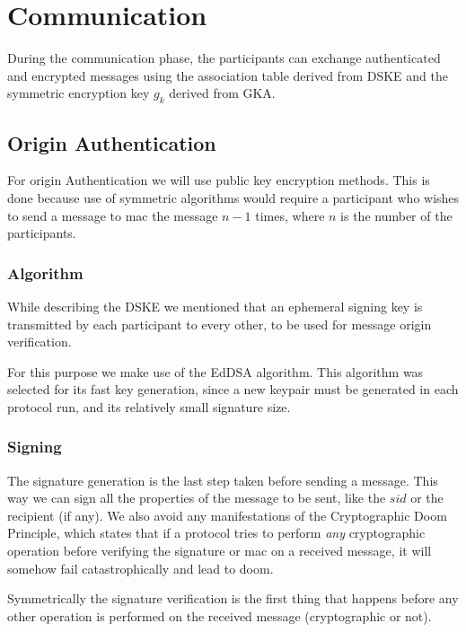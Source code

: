 \documentclass[12pt,titlepage,a4paper]{article}
\begin{document}
{\section{Communication}

During the communication phase, the participants can exchange authenticated
and encrypted messages using the association table derived from DSKE and the
symmetric encryption key $g_k$ derived from GKA.

\subsection{Origin Authentication}

For origin Authentication we will use public key encryption methods. This is
done because use of symmetric algorithms would require a participant who
wishes to send a message to mac the message $n-1$ times, where $n$ is the
number of the participants.

\subsubsection{Algorithm}

While describing the DSKE we mentioned that an ephemeral signing key is transmitted
by each participant to every other, to be used for message origin verification.

For this purpose we make use of the EdDSA algorithm. This algorithm was selected
for its fast key generation, since a new keypair must be generated in each protocol
run, and its relatively small signature size.

\subsubsection{Signing} \label{signing}

The signature generation is the last step taken before sending a message. This
way we can sign all the properties of the message to be sent, like the $sid$ or the
recipient (if any). We also avoid any manifestations of the Cryptographic Doom
Principle, which states that if a protocol tries to perform \emph{any}
cryptographic operation before verifying the signature or mac on a received
message, it will somehow fail catastrophically and lead to doom.

Symmetrically the signature verification is the first thing that happens before
any other operation is performed on the received message (cryptographic or not).

}
\end{document}
